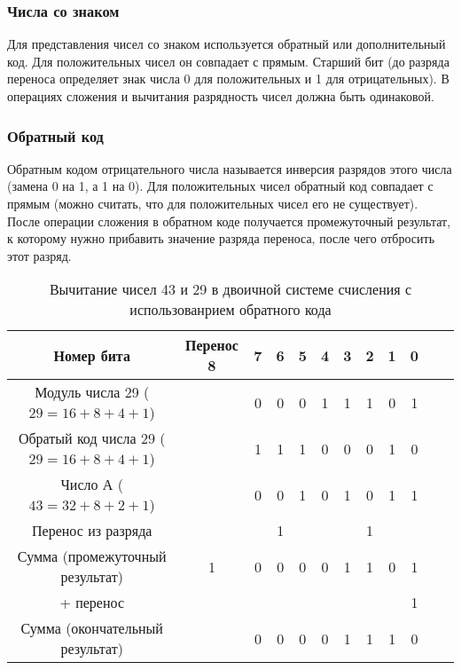 \documentclass[a4paper]{article}
\begin{document}
\subsubsection{Числа со знаком}

Для представления чисел со знаком используется обратный или дополнительный код. Для положительных чисел он совпадает с прямым. Старший бит (до разряда переноса определяет знак числа 0 для положительных и 1 для отрицательных). В операциях сложения и вычитания разрядность чисел должна быть одинаковой.

\subsubsection{Обратный код}
Обратным кодом отрицательного числа называется инверсия разрядов этого числа (замена 0 на 1, а 1 на 0). Для положительных чисел обратный код совпадает с прямым (можно считать, что для положительных чисел его не существует). После операции сложения в обратном коде получается промежуточный результат, к которому нужно прибавить значение разряда переноса, после чего отбросить этот разряд.

\begin{table}\label{tabel:sub_OB}
      \caption{Вычитание чисел 43 и 29 в двоичной системе счисления с использованрием обратного кода}
      \begin{center}
      \begin{tabular}{c * {11}{c}}
        \toprule
        Номер бита & Перенос 8 & 7 & 6 & 5 & 4 & 3 & 2 & 1 & 0 \\
        \toprule
        Модуль числа 29 ($29 = 16 + 8 + 4 + 1$) &  & 0 & 0 & 0 & 1 & 1 & 1 & 0 & 1\\
        \midrule
        Обратый код числа 29 ($29 = 16 + 8 + 4 + 1$) &  & 1 & 1 & 1 & 0 & 0 & 0 & 1 & 0\\
        \midrule
        Число А ($43 = 32 + 8 + 2 + 1$) &  & 0 & 0 & 1 & 0 & 1 & 0 & 1 & 1\\
        \midrule
        Перенос из разряда &  &  & 1 &  &  &  & 1 &  & \\
        \midrule
        Сумма (промежуточный результат) & 1 & 0 & 0 & 0 & 0 & 1 & 1 & 0 & 1 \\
        \midrule
        + перенос &  &  &  &  &  &  &  &  & 1 \\
        \midrule
        Сумма (окончательный результат) &  & 0 & 0 & 0 & 0 & 1 & 1 & 1 & 0 \\
        \bottomrule
      \end{tabular}
    \end{center}
\end{table}
\end{document}
